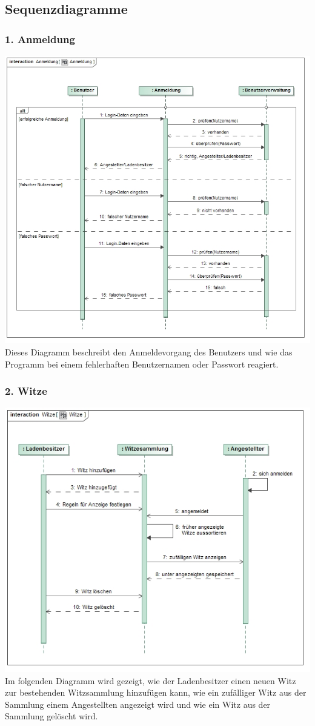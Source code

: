\documentclass[pdftex,12pt,a4paper]{article}
\begin{document}
\subsection*{Sequenzdiagramme}
\subsubsection*{1. Anmeldung}
\includegraphics[width=1\textwidth]{./images/anmeldung}
Dieses Diagramm beschreibt den Anmeldevorgang des Benutzers und wie das Programm bei einem fehlerhaften Benutzernamen oder Passwort reagiert.
\subsubsection*{2. Witze}
\includegraphics[width=1\textwidth]{./images/witze}
Im folgenden Diagramm wird gezeigt, wie der Ladenbesitzer einen neuen Witz zur bestehenden Witzsammlung hinzufügen kann, wie ein zufälliger Witz aus der Sammlung einem Angestellten angezeigt wird und wie ein Witz aus der Sammlung gelöscht wird.
\end{document}
